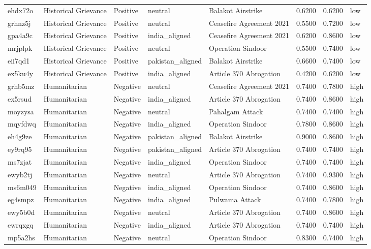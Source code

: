 \begin{longtable}{lllllrrl}
ehdx72o & Historical Grievance & Positive & neutral & Balakot Airstrike & 0.6200 & 0.6200 & low \\
grhnz5j & Historical Grievance & Positive & neutral & Ceasefire Agreement 2021 & 0.5500 & 0.7200 & low \\
gpa4a9c & Historical Grievance & Positive & india\_aligned & Ceasefire Agreement 2021 & 0.6200 & 0.8600 & low \\
mrjplpk & Historical Grievance & Positive & neutral & Operation Sindoor & 0.5500 & 0.7400 & low \\
eii7qd1 & Historical Grievance & Positive & pakistan\_aligned & Balakot Airstrike & 0.6600 & 0.7400 & low \\
ex5ku4y & Historical Grievance & Positive & india\_aligned & Article 370 Abrogation & 0.4200 & 0.6200 & low \\
grhb5mz & Humanitarian & Negative & neutral & Ceasefire Agreement 2021 & 0.7400 & 0.7800 & high \\
ex5rsud & Humanitarian & Negative & india\_aligned & Article 370 Abrogation & 0.7400 & 0.8600 & high \\
moyzysa & Humanitarian & Negative & neutral & Pahalgam Attack & 0.7400 & 0.7400 & high \\
mqyfdwq & Humanitarian & Negative & india\_aligned & Operation Sindoor & 0.7800 & 0.8600 & high \\
eh4g9ze & Humanitarian & Negative & pakistan\_aligned & Balakot Airstrike & 0.9000 & 0.8600 & high \\
ey9rq95 & Humanitarian & Negative & pakistan\_aligned & Article 370 Abrogation & 0.7400 & 0.7400 & high \\
ms7zjat & Humanitarian & Negative & india\_aligned & Operation Sindoor & 0.7400 & 0.7400 & high \\
ewyb2tj & Humanitarian & Negative & neutral & Article 370 Abrogation & 0.7400 & 0.9300 & high \\
ms6m049 & Humanitarian & Negative & india\_aligned & Operation Sindoor & 0.7400 & 0.8600 & high \\
eg4smpz & Humanitarian & Negative & india\_aligned & Pulwama Attack & 0.7400 & 0.7800 & high \\
ewy5b0d & Humanitarian & Negative & neutral & Article 370 Abrogation & 0.7400 & 0.8600 & high \\
ewrqxgq & Humanitarian & Negative & india\_aligned & Article 370 Abrogation & 0.7400 & 0.7400 & high \\
mp5a2hs & Humanitarian & Negative & neutral & Operation Sindoor & 0.8300 & 0.7400 & high \\

\end{longtable}
